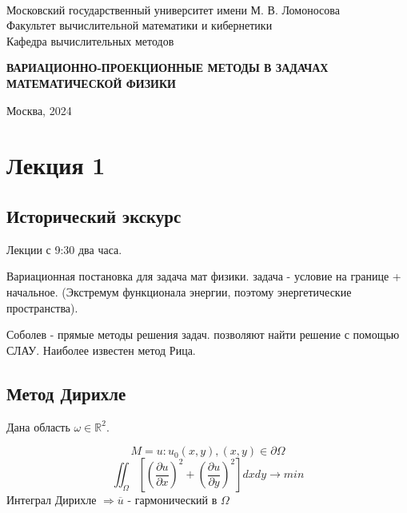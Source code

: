 \documentclass[12pt, a4paper]{article}
\begin{document}
\thispagestyle{empty}

\begin{center}
	\ \vspace{-1cm}

	{Московский государственный университет имени М. В. Ломоносова}\\
	Факультет вычислительной математики и кибернетики\\
	Кафедра вычислительных методов

	\vspace{8cm}
	\begin{spacing}{2.5}
		{\huge \bfseries ВАРИАЦИОННО-ПРОЕКЦИОННЫЕ МЕТОДЫ В ЗАДАЧАХ МАТЕМАТИЧЕСКОЙ ФИЗИКИ}
	\end{spacing}


\end{center}

\vfill

\begin{center}
	Москва, 2024
\end{center}

\enlargethispage{2\baselineskip}

\newpage

\tableofcontents

\newpage

\section{Лекция 1}

\subsection{Исторический экскурс}

Лекции с 9:30 два часа.

Вариационная постановка для задача мат физики.
задача - условие на границе + начальное. (Экстремум функционала энергии, поэтому энергетические пространства).

Соболев - прямые методы решения задач. позволяют найти решение с помощью СЛАУ. Наиболее известен метод Рица.

\subsection{Метод Дирихле}

Дана область $ \omega \in \mathbb{R}^2$.

\[ M = {u:u_{0}(x,y), (x,y) \in \partial \Omega} \]
\[ \iint_{\Omega}[{(\frac{\partial u}{\partial x})}^2+{(\frac{\partial u}{\partial y})}^2] dx dy \rightarrow min \]
Интеграл Дирихле $ \Rightarrow \overline{u} $ - гармонический в $ \Omega $
\end{document}
